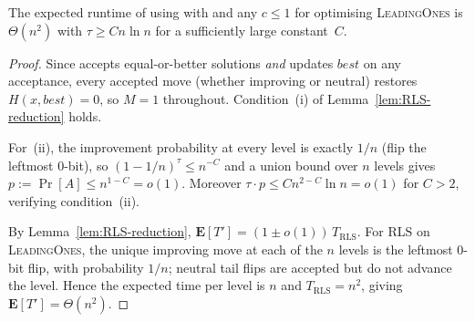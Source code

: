\begin{theorem}\label{thm:LBleadingones}
The expected runtime of \lastBest{} using \IPHfcm{} with \linHD{} and any
$c\leq 1$ for optimising \textsc{LeadingOnes} is $\Theta(n^2)$ with
$\tau\geq Cn\ln n$ for a sufficiently large constant~$C$.
\end{theorem}
\begin{proof}
Since \lastBest{} accepts equal-or-better solutions \emph{and} updates
$\mathit{best}$ on any acceptance, every accepted move (whether improving or
neutral) restores $H(x,\mathit{best})=0$, so $M=1$ throughout.
Condition~(i) of Lemma~\ref{lem:RLS-reduction} holds.

For~(ii), the improvement probability at every level is exactly $1/n$
(flip the leftmost $0$-bit), so $(1-1/n)^\tau\leq n^{-C}$
and a union bound over $n$ levels gives $p:=\Pr[A]\leq n^{1-C}=o(1)$.
Moreover $\tau\cdot p\leq Cn^{2-C}\ln n=o(1)$ for $C>2$, verifying
condition~(ii).

By Lemma~\ref{lem:RLS-reduction},
$\mathbf{E}[T']=(1\pm o(1))\,T_{\mathrm{RLS}}$.
For RLS on \textsc{LeadingOnes}, the unique improving move at each of the $n$
levels is the leftmost $0$-bit flip, with probability $1/n$; neutral tail
flips are accepted but do not advance the level.  Hence the expected time per
level is $n$ and $T_{\mathrm{RLS}}=n^2$, giving $\mathbf{E}[T']=\Theta(n^2)$.
\end{proof}

